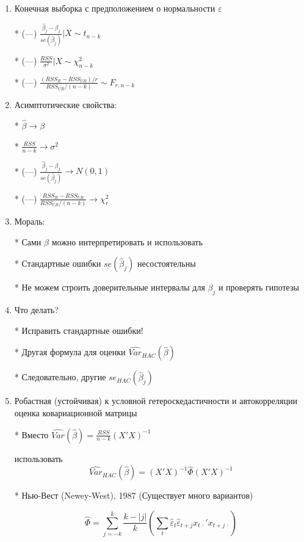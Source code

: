\documentclass[12pt,a4paper]{article}
\begin{document}
{\begin{enumerate}
* Условная несмещенность, $E(\hat{\beta}|X)=\beta$

* (---) Оценки неэффективны

\item  Конечная выборка с предположением о нормальности $\varepsilon$

* (---) $\frac{\hat{\beta}_j-\beta_j}{se(\hat{\beta}_j)} | X \sim t_{n-k}$

* (---) $\frac{RSS}{\sigma^2} |X \sim \chi^2_{n-k}$

* (---) $\frac{(RSS_R-RSS_{UR})/r}{RSS_{UR}/(n-k)} \sim F_{r,n-k}$

\newpage
\item  Асимптотические свойства:

*  $\hat{\beta} \to \beta $

* $\frac{RSS}{n-k} \to \sigma^2 $ 

* (---) $\frac{\hat{\beta}_j-\beta_j}{se(\hat{\beta}_j)} \to N(0,1)$

* (---) $\frac{RSS_R-RSS_{UR}}{RSS_{UR}/(n-k)} \to \chi^2_r$

\item Мораль:

* Сами $\hat{\beta}$ можно интерпретировать и использовать

* Стандартные ошибки $se(\hat{\beta}_j)$ несостоятельны

* Не можем строить доверительные интервалы для $\beta_j$ и проверять гипотезы

\newpage
\item Что делать?

* Исправить стандартные ошибки! 

* Другая формула для оценки $\widehat{Var}_{HAC}(\hat{\beta})$

* Следовательно, другие $se_{HAC}(\hat{\beta}_j)$

\item Робастная (устойчивая) к условной гетероскедастичности и автокорреляции оценка ковариационной матрицы

* Вместо $\widehat{Var}(\hat{\beta})=\frac{RSS}{n-k}(X'X)^{-1}$ 

использовать 
\[
\widehat{Var}_{HAC}(\hat{\beta})=(X'X)^{-1}\hat{\Phi}(X'X)^{-1}
\]

* Нью-Вест (Newey-West), 1987  (Существует много вариантов)

\[
\hat{\Phi} = \sum_{j=-k}^k \frac{k-|j|}{k} \left(  \sum_t \hat{\varepsilon}_t\hat{\varepsilon}_{t+j} x_{t\,\cdot}'x_{t+j\,\cdot} \right)
\]


\end{enumerate}}
\end{document}
